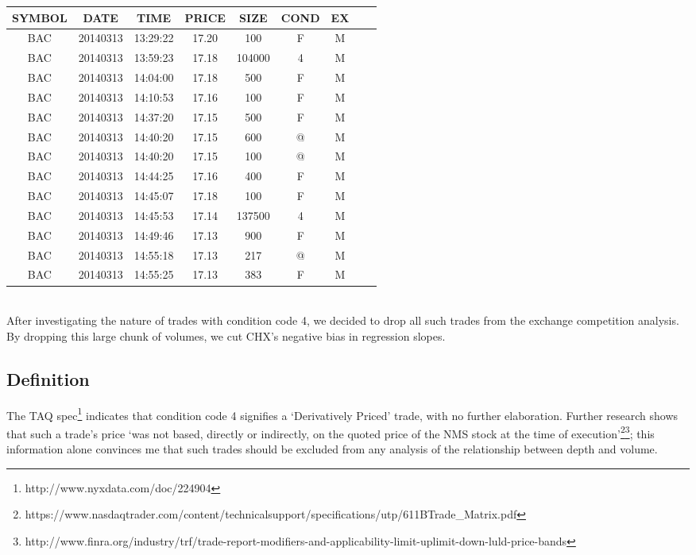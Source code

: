 \documentclass{article}
\begin{document}
\begin{tabular}{ | c| c | c | c | c | c | c | c| c|}
\hline
SYMBOL  &   DATE     &TIME &PRICE   &SIZE &COND &EX\\ \hline
BAC &20140313 &13:29:22& 17.20    &100        &F  &M \\ \hline 
BAC& 20140313& 13:59:23 &17.18 &104000     &4  &M \\ \hline 
BAC& 20140313& 14:04:00 &17.18 &   500    &  F&  M \\ \hline 
BAC& 20140313& 14:10:53 &17.16 &   100   &        F&  M \\ \hline 
BAC& 20140313& 14:37:20 &17.15 &   500   &        F&  M \\ \hline 
BAC& 20140313& 14:40:20 &17.15 &   600   &         @&  M \\ \hline 
BAC& 20140313& 14:40:20 &17.15 &   100   &        @&  M \\ \hline 
BAC& 20140313& 14:44:25 &17.16 &   400   &         F&  M \\ \hline 
BAC& 20140313& 14:45:07 &17.18 &   100   &         F&  M \\ \hline 
BAC& 20140313& 14:45:53 &17.14 &137500 &         4&  M \\ \hline 
BAC& 20140313& 14:49:46 &17.13 &   900   &       F&  M \\ \hline 
BAC& 20140313& 14:55:18 &17.13 &   217   &         @&  M \\ \hline 
BAC& 20140313& 14:55:25 &17.13 &   383   &      F&  M\\
 \hline 
\end{tabular}\\

After investigating the nature of trades with condition code 4, we decided to drop all such trades from the exchange competition analysis. By dropping this large chunk of volumes, we cut CHX's negative bias in regression slopes.\\

\subsection{Definition}
The TAQ spec\footnote{http://www.nyxdata.com/doc/224904} indicates that condition code 4 signifies a `Derivatively Priced' trade, with no further elaboration. Further research shows that such a trade's price `was not based, directly or
indirectly, on the quoted price of the NMS stock at the time of execution'\footnote{https://www.nasdaqtrader.com/content/technicalsupport/specifications/utp/611BTrade\_Matrix.pdf}\footnote{http://www.finra.org/industry/trf/trade-report-modifiers-and-applicability-limit-uplimit-down-luld-price-bands}; this information alone convinces me that such trades should be excluded from any analysis of the relationship between depth and volume.\\
\end{document}
